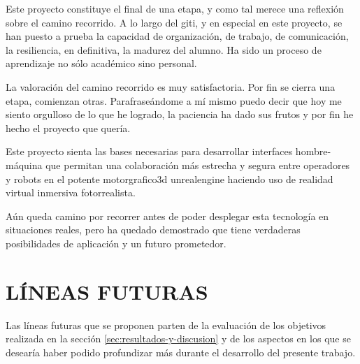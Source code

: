 \documentclass[a4paper, 12pt, spanish, twoside]{article}
\begin{document}
Este proyecto constituye el final de una etapa, y como tal merece una reflexión sobre el camino recorrido. A lo largo del \acrshort{giti}, y en especial en este proyecto, se han puesto a prueba la capacidad de organización, de trabajo, de comunicación, la resiliencia, en definitiva, la madurez del alumno. Ha sido un proceso de aprendizaje no sólo académico sino personal. 

La valoración del camino recorrido es muy satisfactoria. Por fin se cierra una etapa, comienzan otras. Parafraseándome a mí mismo puedo decir que hoy me siento orgulloso de lo que he logrado, la paciencia ha dado sus frutos y por fin he hecho el proyecto que quería. 

Este proyecto sienta las bases necesarias para desarrollar interfaces hombre-máquina que permitan una colaboración más estrecha y segura entre operadores y robots en el potente \gls{motorgrafico3d} \gls{unrealengine} haciendo uso de realidad virtual inmersiva fotorrealista. 

Aún queda camino por recorrer antes de poder desplegar esta tecnología en situaciones reales, pero ha quedado demostrado que tiene verdaderas posibilidades de aplicación y un futuro prometedor. 

\clearpage





\newpage
\section{LÍNEAS FUTURAS} \label{sec:lineas-futuras}

Las líneas futuras que se proponen parten de la evaluación de los objetivos realizada en la sección \ref{sec:resultados-y-discusion} y de los aspectos en los que se desearía haber podido profundizar más durante el desarrollo del presente trabajo. 
\end{document}
